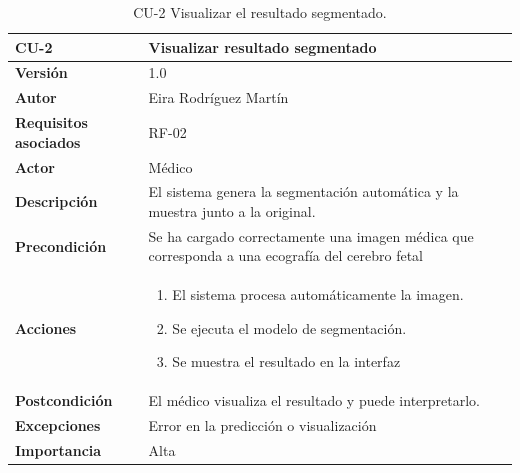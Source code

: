 \begin{table}[!h]
	\centering
	\begin{tabularx}{\linewidth}{ p{} p{} }
		\toprule
		\textbf{CU-2}    & \textbf{Visualizar resultado segmentado}\\
		\toprule
		\textbf{Versión}              & 1.0    \\
		\textbf{Autor}                & Eira Rodríguez Martín \\
		\textbf{Requisitos asociados} & RF-02 \\
        \textbf{Actor}                & Médico \\
		\textbf{Descripción}          & El sistema genera la segmentación automática y la muestra junto a la original.\\
		\textbf{Precondición}         & Se ha cargado correctamente una imagen médica que corresponda a una ecografía del cerebro fetal \\
		\textbf{Acciones}             &
		\begin{enumerate}
			\def\labelenumi{\arabic{enumi}.}
			\tightlist
			\item El sistema procesa automáticamente la imagen.
			\item Se ejecuta el modelo de segmentación.
            \item Se muestra el resultado en la interfaz
		\end{enumerate}\\
		\textbf{Postcondición}        & El médico visualiza el resultado y puede interpretarlo. \\
		\textbf{Excepciones}          & Error en la predicción o visualización \\
		\textbf{Importancia}          & Alta \\
		\bottomrule
	\end{tabularx}
	\caption{CU-2 Visualizar el resultado segmentado.}
\end{table}

